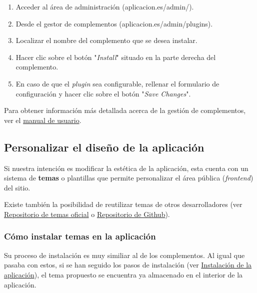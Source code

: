 \documentclass[
]{article}
\providecommand{\tightlist}{%
  \setlength{\itemsep}{0pt}\setlength{\parskip}{0pt}}
\begin{document}
\begin{enumerate}
\def\labelenumi{\arabic{enumi}.}
\tightlist
\item
  Acceder al área de administración ({aplicacion.es/admin/}).
\item
  Desde el gestor de complementos ({aplicacion.es/admin/plugins}).
\item
  Localizar el nombre del complemento que se desea instalar.
\item
  Hacer clic sobre el botón "\emph{Install}" situado en la parte derecha
  del complemento.
\item
  En caso de que el \emph{plugin} sea configurable, rellenar el
  formulario de configuración y hacer clic sobre el botón "\emph{Save
  Changes}".
\end{enumerate}

Para obtener información más detallada acerca de la gestión de
complementos, ver el
\href{https://tfg-ceniehariadne.readthedocs.io/es/latest/anexos/E_Manual_usuario.html\#manual-de-usuario}{manual
de usuario}.

\hypertarget{personalizar-el-diseuxf1o-de-la-aplicaciuxf3n}{%
\subsection{Personalizar el diseño de la
aplicación}\label{personalizar-el-diseuxf1o-de-la-aplicaciuxf3n}}

Si nuestra intención es modificar la estética de la aplicación, esta
cuenta con un sistema de \textbf{temas} o plantillas que permite
personalizar el área pública (\emph{frontend}) del sitio.

Existe también la posibilidad de reutilizar temas de otros
desarrolladores (ver
\href{https://omeka.org/classic/themes/}{Repositorio de temas oficial} o
\href{https://daniel-km.github.io/UpgradeToOmekaS/omeka_themes.html}{Repositorio
de Github}).

\hypertarget{cuxf3mo-instalar-temas-en-la-aplicaciuxf3n}{%
\subsubsection{Cómo instalar temas en la
aplicación}\label{cuxf3mo-instalar-temas-en-la-aplicaciuxf3n}}

Su proceso de instalación es muy similiar al de los complementos. Al
igual que pasaba con estos, si se han seguido los pasos de instalación
(ver \protect\hyperlink{instalaciuxf3n-de-la-aplicaciuxf3n}{Instalación
de la aplicación}), el tema propuesto se encuentra ya almacenado en el
interior de la aplicación.
\end{document}
